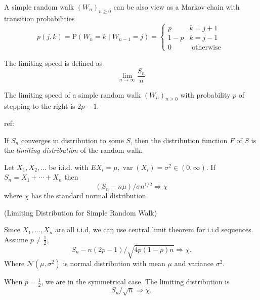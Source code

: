 	A simple random walk $\left(W_n\right)_{n \geq 0}$ can be also view as a Markov chain with transition probabilities
\[
p(j, k)=\mathrm{P}\left(W_n=k \mid W_{n-1}=j\right)= \begin{cases}p & k=j+1 \\ 1-p & k=j-1 \\ 0 & \text { otherwise }\end{cases}
\]

\begin{definition}
	The limiting speed is defined as
	\[
		\lim _{n \rightarrow \infty} \frac{S_n}{n}
	\]
\end{definition}

\begin{theorem}
	The limiting speed of a simple random walk $\left(W_n\right)_{n \geq 0}$ with probability $p$ of stepping to the right is $2 p-1$. 

	ref: \cite{cinkoskeSpeedExcitedAsymmetric2018}
\end{theorem}

\begin{definition}
	If $S_n$ converges in distribution to some $S$, then the distribution function $F$ of $S$ is the \textit{limiting distribution} of the random walk.
\end{definition}



\begin{theorem}
	Let $X_1, X_2, \ldots$ be i.i.d. with $E X_i=\mu, \operatorname{var}\left(X_i\right)=\sigma^2 \in(0, \infty)$. If $S_n=X_1+\cdots+X_n$ then
\[
\left(S_n-n \mu\right) / \sigma n^{1 / 2} \Rightarrow \chi
\]
where $\chi$ has the standard normal distribution.
\end{theorem}

\begin{example}
	(Limiting Distribution for Simple Random Walk)

	Since $X_1, \ldots, X_n$ are all i.i.d, we can use central limit theorem for i.i.d sequences. Assume $p\neq \frac{1}{2}$, 
	\[
		S_n - n(2p-1)/ \sqrt{4p(1-p)n}  \Rightarrow \chi
	.\] 
	Where $\mathcal{N}(\mu,\sigma^2)$ is normal distribution with mean $\mu$ and variance $\sigma^2$.

	When $p = \frac{1}{2}$, we are in the symmetrical case. The limiting distribution is
\[
		S_n/ \sqrt{n}  \Rightarrow \chi
	.\]
\end{example}



